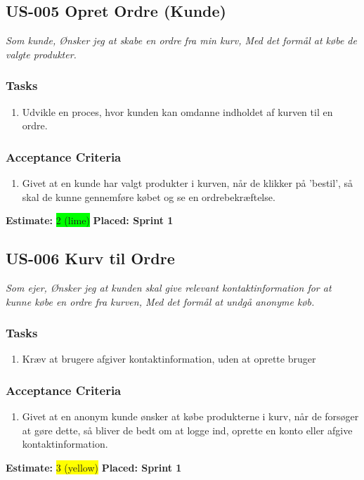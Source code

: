 \subsection{US-005 Opret Ordre (Kunde)}
\label{sec:US-005}
\textit{Som kunde, Ønsker jeg at skabe en ordre fra min kurv, Med det formål at købe de valgte produkter.}
\subsubsection*{\textbf{Tasks}}
\begin{enumerate}
  \item Udvikle en proces, hvor kunden kan omdanne indholdet af kurven til en ordre.
\end{enumerate}
\subsubsection*{\textbf{Acceptance Criteria}}
\begin{enumerate}
  \item Givet at en kunde har valgt produkter i kurven, når de klikker på 'bestil', så skal de kunne gennemføre købet og se en ordrebekræftelse.
\end{enumerate}
\textbf{Estimate:} \colorbox{lime}{2 (lime)}
\textbf{Placed: Sprint 1}
\par\noindent\dotfill

\subsection{US-006 Kurv til Ordre}
\label{sec:US-006}
\textit{Som ejer, Ønsker jeg at kunden skal give relevant kontaktinformation for at kunne købe en ordre fra kurven, Med det formål at undgå anonyme køb.}
\subsubsection*{\textbf{Tasks}}
\begin{enumerate}
  \item Kræv at brugere afgiver kontaktinformation, uden at oprette bruger
\end{enumerate}
\subsubsection*{\textbf{Acceptance Criteria}}
\begin{enumerate}
  \item Givet at en anonym kunde ønsker at købe produkterne i kurv, når de forsøger at gøre dette, så bliver de bedt om at logge ind, oprette en konto eller afgive kontaktinformation.
\end{enumerate}
\textbf{Estimate:} \colorbox{yellow}{3 (yellow)}
\textbf{Placed: Sprint 1}
\par\noindent\dotfill

